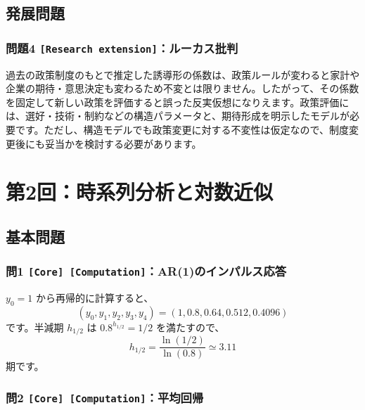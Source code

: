 \documentclass[
  japanese,
  lualatex,
  ja=standard,
  11pt,
  a4paper]{ltjsarticle}
\begin{document}
\subsection{発展問題}\label{ux767aux5c55ux554fux984c}

\subsubsection{\texorpdfstring{問題4
\texttt{{[}Research\ extension{]}}：ルーカス批判}{問題4 {[}Research extension{]}：ルーカス批判}}\label{ux554fux984c4-research-extensionux30ebux30fcux30abux30b9ux6279ux5224}

過去の政策制度のもとで推定した誘導形の係数は、政策ルールが変わると家計や企業の期待・意思決定も変わるため不変とは限りません。したがって、その係数を固定して新しい政策を評価すると誤った反実仮想になりえます。政策評価には、選好・技術・制約などの構造パラメータと、期待形成を明示したモデルが必要です。ただし、構造モデルでも政策変更に対する不変性は仮定なので、制度変更後にも妥当かを検討する必要があります。

\clearpage

\section{第2回：時系列分析と対数近似}\label{ux7b2c2ux56deux6642ux7cfbux5217ux5206ux6790ux3068ux5bfeux6570ux8fd1ux4f3c}

\subsection{基本問題}\label{ux57faux672cux554fux984c-1}

\subsubsection{\texorpdfstring{問1
\texttt{{[}Core{]}\ {[}Computation{]}}：AR(1)のインパルス応答}{問1 {[}Core{]} {[}Computation{]}：AR(1)のインパルス応答}}\label{ux554f1-core-computationar1ux306eux30a4ux30f3ux30d1ux30ebux30b9ux5fdcux7b54}

\(y_0=1\) から再帰的に計算すると、 \[
(y_0,y_1,y_2,y_3,y_4)
=(1,0.8,0.64,0.512,0.4096)
\] です。半減期 \(h_{1/2}\) は \(0.8^{h_{1/2}}=1/2\) を満たすので、 \[
h_{1/2}=\frac{\ln(1/2)}{\ln(0.8)}\simeq3.11
\] 期です。

\subsubsection{\texorpdfstring{問2
\texttt{{[}Core{]}\ {[}Computation{]}}：平均回帰}{問2 {[}Core{]} {[}Computation{]}：平均回帰}}\label{ux554f2-core-computationux5e73ux5747ux56deux5e30}
\end{document}
